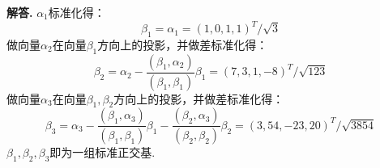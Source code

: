 \documentclass[12pt, a4paper, oneside]{ctexart}
\newenvironment{solution}{\par\noindent\textbf{解答. }}{\par}
\begin{document}
\begin{solution}
    $\alpha_1$标准化得：
    \begin{equation*}
        \beta_1=\alpha_1=(1,0,1,1)^T/\sqrt{3}
    \end{equation*}
    做向量$\alpha_2$在向量$\beta_1$方向上的投影，并做差标准化得：
    \begin{equation*}
        \beta_2=\alpha_2-\frac{(\beta_1,\alpha_2)}{(\beta_1,\beta_1)}\beta_1=(7,3,1,-8)^T/\sqrt{123}
    \end{equation*}
    做向量$\alpha_3$在向量$\beta_1,\beta_2$方向上的投影，并做差标准化得：
    \begin{equation*}
        \beta_3=\alpha_3-\frac{(\beta_1,\alpha_3)}{(\beta_1,\beta_1)}\beta_1-\frac{(\beta_2,\alpha_3)}{(\beta_2,\beta_2)}\beta_2=(3,54,-23,20)^T/\sqrt{3854}
    \end{equation*}
    $\beta_1,\beta_2,\beta_3$即为一组标准正交基.
\end{solution}
\end{document}
